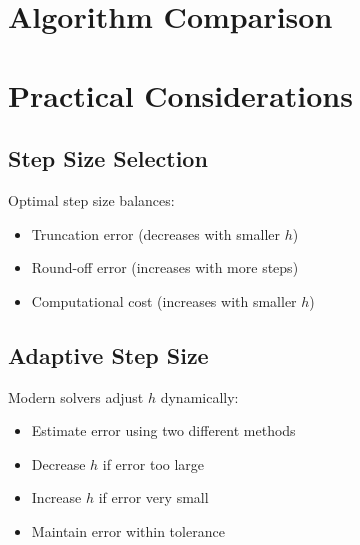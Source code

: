 \documentclass[12pt]{article}
\begin{document}
\section{Algorithm Comparison}


\section{Practical Considerations}

\subsection{Step Size Selection}

\begin{keypoint}
Optimal step size balances:
\begin{itemize}
\item Truncation error (decreases with smaller $h$)
\item Round-off error (increases with more steps)
\item Computational cost (increases with smaller $h$)
\end{itemize}
\end{keypoint}

\subsection{Adaptive Step Size}

\begin{insight}
Modern solvers adjust $h$ dynamically:
\begin{itemize}
\item Estimate error using two different methods
\item Decrease $h$ if error too large
\item Increase $h$ if error very small
\item Maintain error within tolerance
\end{itemize}
\end{insight}
\end{document}
